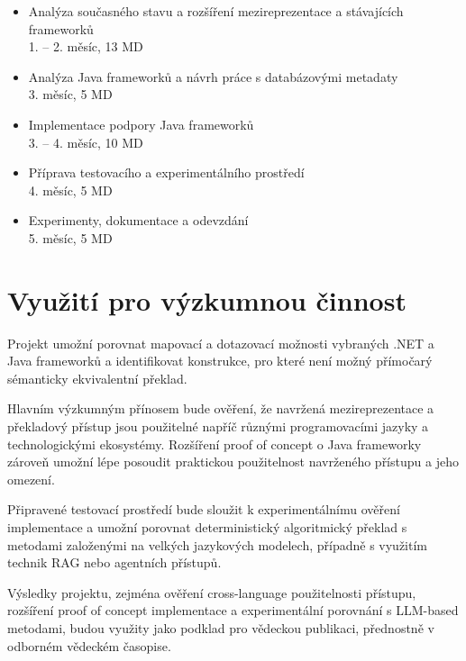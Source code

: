 \documentclass{article}
\begin{document}
\begin{itemize}[leftmargin=*]
\item Analýza současného stavu a rozšíření mezireprezentace a stávajících frameworků
\\1. -- 2. měsíc, 13 MD
\item Analýza Java frameworků a návrh práce s databázovými metadaty
\\3. měsíc, 5 MD
\item Implementace podpory Java frameworků
\\3. -- 4. měsíc, 10 MD
\item Příprava testovacího a experimentálního prostředí
\\4. měsíc, 5 MD
\item Experimenty, dokumentace a odevzdání
\\5. měsíc, 5 MD
\end{itemize}

\section{Využití pro výzkumnou činnost}

Projekt umožní porovnat mapovací a dotazovací možnosti vybraných .NET a Java frameworků a identifikovat konstrukce, pro které není možný přímočarý sémanticky ekvivalentní překlad.

Hlavním výzkumným přínosem bude ověření, že navržená mezireprezentace a překladový přístup jsou použitelné napříč různými programovacími jazyky a technologickými ekosystémy. Rozšíření proof of concept o Java frameworky zároveň umožní lépe posoudit praktickou použitelnost navrženého přístupu a jeho omezení.

Připravené testovací prostředí bude sloužit k experimentálnímu ověření implementace a umožní porovnat deterministický algoritmický překlad s metodami založenými na velkých jazykových modelech, případně s využitím technik RAG nebo agentních přístupů.

Výsledky projektu, zejména ověření cross-language použitelnosti přístupu, rozšíření proof of concept implementace a experimentální porovnání s LLM-based metodami, budou využity jako podklad pro vědeckou publikaci, přednostně v odborném vědeckém časopise.
\end{document}
